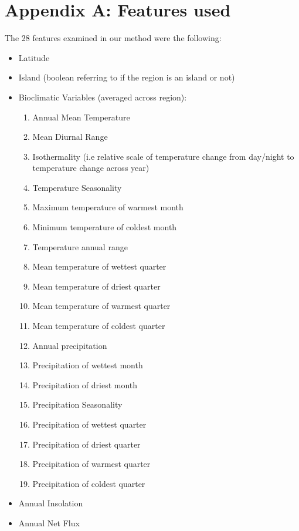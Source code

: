 \documentclass[prl,showpacs,superscriptaddress,twocolumn,longbibliography]{revtex4-1}
\begin{document}



\onecolumngrid
\appendix

\section{Appendix A: Features used} \label{appendix:raw}
The 28 features examined in our method were the following:
\begin{itemize}
\item Latitude
\item Island (boolean referring to if the region is an island or not)
\item Bioclimatic Variables (averaged across region)\cite{fick_wordlclim_2017}:
\begin{enumerate}
	\item Annual Mean Temperature
	\item Mean Diurnal Range
	\item Isothermality (i.e relative scale of temperature change from day/night to temperature change across year)
	\item Temperature Seasonality
	\item Maximum temperature of warmest month
	\item Minimum temperature of coldest month
	\item Temperature annual range
	\item Mean temperature of wettest quarter
	\item Mean temperature of driest quarter
	\item Mean temperature of warmest quarter
	\item Mean temperature of coldest quarter
	\item Annual precipitation
	\item Precipitation of wettest month
	\item Precipitation of driest month
	\item Precipitation Seasonality
	\item Precipitation of wettest quarter
	\item Precipitation of driest quarter
	\item Precipitation of warmest quarter
	\item Precipitation of coldest quarter
\end{enumerate}
\item Annual Insolation\cite{nasa_insol}
\item Annual Net Flux\cite{nasa_netflux}

\end{itemize}
\end{document}
